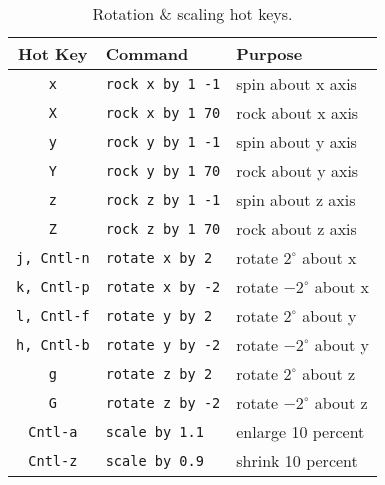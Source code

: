 \begin{table}[htb]
  \hspace{1in}
  \begin{tabular}{|c|l|l|} \hline
    Hot Key & Command & Purpose\\ \hline\hline
	{\tt x}		& {\tt rock x by 1 -1} 	& spin about x axis \\
	{\tt X}		& {\tt rock x by 1 70} 	& rock about x axis \\
	{\tt y}		& {\tt rock y by 1 -1} 	& spin about y axis \\
	{\tt Y}		& {\tt rock y by 1 70} 	& rock about y axis \\
	{\tt z}		& {\tt rock z by 1 -1} 	& spin about z axis \\
	{\tt Z}		& {\tt rock z by 1 70} 	& rock about z axis \\
	{\tt j, Cntl-n}	& {\tt rotate x by 2}	& rotate $2^{\circ}$ about x \\
	{\tt k, Cntl-p}	& {\tt rotate x by -2}	& rotate $-2^{\circ}$ about x \\
	{\tt l, Cntl-f}	& {\tt rotate y by 2}	& rotate $2^{\circ}$ about y \\
	{\tt h, Cntl-b}	& {\tt rotate y by -2}	& rotate $-2^{\circ}$ about y \\
	{\tt g}		& {\tt rotate z by 2}	& rotate $2^{\circ}$ about z \\
	{\tt G}		& {\tt rotate z by -2}	& rotate $-2^{\circ}$ about z \\
	{\tt Cntl-a}	& {\tt scale by 1.1}	& enlarge 10 percent \\
	{\tt Cntl-z}	& {\tt scale by 0.9}	& shrink 10 percent \\ \hline
  \end{tabular}
  \caption{Rotation \& scaling hot keys.}
  \label{table:ug:rotations}
\end{table}


